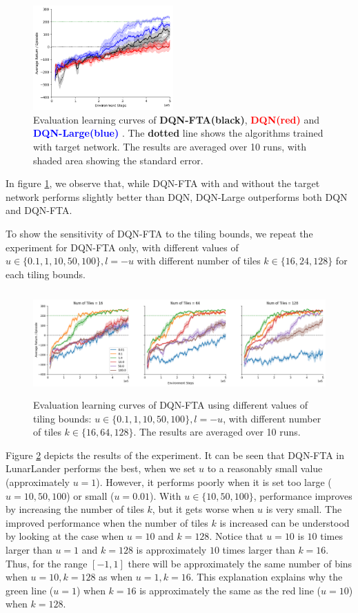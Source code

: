 \documentclass{article}
\begin{document}
\begin{figure}[h]
    \centering
    \includegraphics[height=4cm]{ftavrelu.png}
    \caption{Evaluation learning curves of {\bf DQN-FTA(black)}, {\textcolor{red} {\bf DQN(red)}} and {\textcolor{blue} {\bf DQN-Large(blue)} }. The {\bf dotted} line shows the algorithms trained with target network. The results are averaged over 10 runs, with shaded area showing the standard error.}
    \label{fig:ftavrelu}
\end{figure}



In figure \ref{fig:ftavrelu}, we observe that, while DQN-FTA with and without the target network performs slightly better than DQN, DQN-Large outperforms both DQN and DQN-FTA.

To show the sensitivity of DQN-FTA to the tiling bounds, we repeat the experiment for DQN-FTA only, with different values of $u \in \{0.1,1,10,50,100\}, l = -u$ with different number of tiles $k \in \{16, 24, 128\}$ for each tiling bounds.

\begin{figure}[h]
    \centering
    \includegraphics[height=4cm]{sweepfta.png}
    \caption{Evaluation learning curves of DQN-FTA using different values of tiling bounds: $u \in \{0.1, 1, 10, 50, 100\}, l = -u$, with different number of tiles $k \in \{16, 64, 128\}$. The results are averaged over 10 runs.}
    \label{fig:sweepfta}
\end{figure}

Figure \ref{fig:sweepfta} depicts the results of the experiment.
It can be seen that DQN-FTA in LunarLander performs the best, when we set $u$ to a reasonably small value (approximately $u = 1$). 
However, it performs poorly when it is set too large ($u=10, 50, 100$) or small ($u=0.01$). 
With $u \in \{10, 50, 100\}$, performance improves by increasing the number of tiles $k$, but it gets worse when $u$ is very small.
The improved performance when the number of tiles $k$ is increased can be understood by looking at the case when $u=10$ and $k=128$.
Notice that $u=10$ is $10$ times larger than $u=1$ and $k=128$ is approximately $10$ times larger than $k=16$. 
Thus, for the range $[-1, 1]$ there will be approximately the same number of bins when $u=10, k=128$ as when $u=1, k=16$.
This explanation explains why the green line ($u=1$) when $k=16$ is approximately the same as the red line ($u=10$) when $k=128$.
\end{document}

